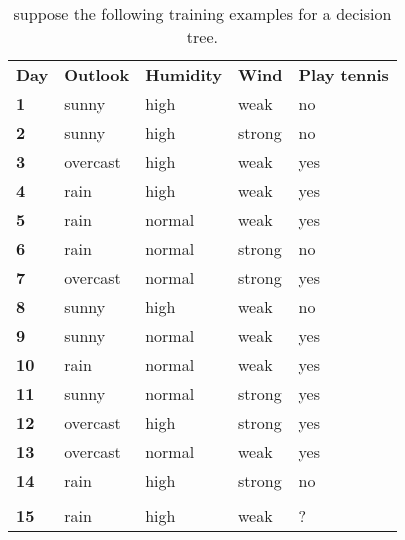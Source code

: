 \begin{table}[H]
\centering
\caption{suppose the following training examples for a decision tree.}
\label{decisionTreeTable}
\begin{tabular}{lllll}
\textbf{Day} & \textbf{Outlook} & \textbf{Humidity} & \textbf{Wind} & \textbf{Play tennis} \\
\textbf{1}   & sunny            & high              & weak          & no                   \\
\textbf{2}   & sunny            & high              & strong        & no                   \\
\textbf{3}   & overcast         & high              & weak          & yes                  \\
\textbf{4}   & rain             & high              & weak          & yes                  \\
\textbf{5}   & rain             & normal            & weak          & yes                  \\
\textbf{6}   & rain             & normal            & strong        & no                   \\
\textbf{7}   & overcast         & normal            & strong        & yes                  \\
\textbf{8}   & sunny            & high              & weak          & no                   \\
\textbf{9}   & sunny            & normal            & weak          & yes                  \\
\textbf{10}  & rain             & normal            & weak          & yes                  \\
\textbf{11}  & sunny            & normal            & strong        & yes                  \\
\textbf{12}  & overcast         & high              & strong        & yes                  \\
\textbf{13}  & overcast         & normal            & weak          & yes                  \\
\textbf{14}  & rain             & high              & strong        & no                   \\
             &                  &                   &               &                      \\
\textbf{15}  & rain             & high              & weak          & ?                   
\end{tabular}
\end{table}

